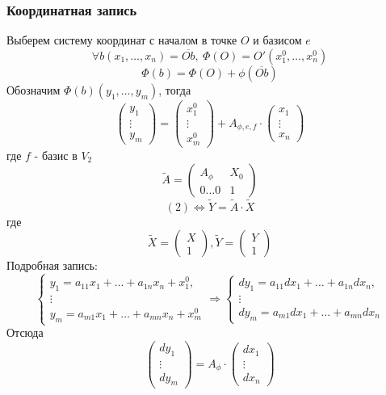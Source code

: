 \subsubsection*{Координатная запись}
Выберем систему координат с началом в точке $O$ и базисом $e$
\[\forall b(x_1,\dots,x_n)=\overline{Ob},\ \Phi(O)=O'(x_1^0,\dots,x_n^0)\]
\[\Phi(b)=\Phi(O)+\phi(\overline{Ob})\]
Обозначим $\Phi(b)(y_1,\dots,y_m)$, тогда
\[\begin{pmatrix}
    y_1\\
    \vdots\\
    y_m
\end{pmatrix}
=
\begin{pmatrix}
    x_1^0\\
    \vdots\\
    x_m^0
\end{pmatrix}
+A_{\phi,e,f}\cdot
\begin{pmatrix}
    x_1\\
    \vdots\\
    x_n
\end{pmatrix}
\]
где $f$ - базис в $V_2$
\[\widetilde{A}=\begin{pmatrix}
    A_{\phi} & X_0\\
    0\dots0 & 1
\end{pmatrix}
\]
\[(2) \Longleftrightarrow \widetilde{Y}=\widetilde{A}\cdot \widetilde{X}\]
где
\[
\widetilde{X}=\begin{pmatrix}
    X\\
    1
\end{pmatrix},
\widetilde{Y}=\begin{pmatrix}
    Y\\
    1
\end{pmatrix}
\]
Подробная запись:
\[\begin{cases}
    y_1=a_{11}x_1+\dots+a_{1n}x_n+x_1^0,\\
    \vdots\\
    y_m=a_{m1}x_1+\dots+a_{mn}x_n+x_m^0
\end{cases}
\Longrightarrow
\begin{cases}
    dy_1=a_{11}dx_1+\dots+a_{1n}dx_n,\\
    \vdots\\
    dy_m=a_{m1}dx_1+\dots+a_{mn}dx_n
\end{cases}
\]
Отсюда
\[\begin{pmatrix}
    dy_1\\
    \vdots\\
    dy_m
\end{pmatrix}
=A_{\phi}\cdot
\begin{pmatrix}
    dx_1\\
    \vdots\\
    dx_n
\end{pmatrix}
\]
